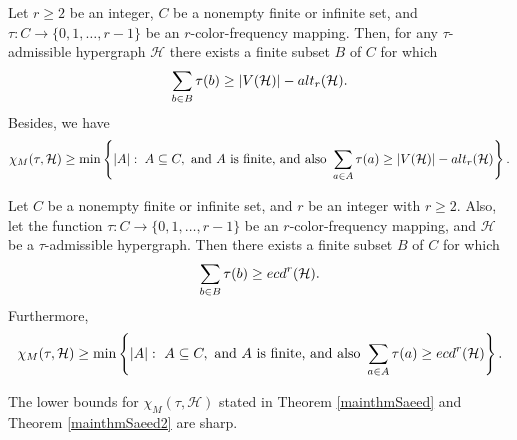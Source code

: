 \documentclass[10pt,a4paper]{amsart}
\begin{document}
\begin{theorem}\label{mainthmSaeed}
	Let $r\geq 2$ be an integer, $C$ be a nonempty finite or infinite set, and
	$\tau: C \longrightarrow \{0,1,\ldots,r-1\}$ be an $r$-color-frequency  mapping.
	Then, for any $\tau$-admissible hypergraph ${\mathcal H}$ there exists a finite subset
	$B$ of $C$ for which
	$$\sum_{b\in B}\tau(b) \geq  |V({\mathcal H})|-{\rm alt}_r({\mathcal H}) .$$
	Besides, we have
	$$\chi_M(\tau,{\mathcal H})\geq \min \left\{|A|:\;   A \subseteq C, \mbox{ and } A \mbox{ is finite,}  \mbox{ and also } \sum_{a\in A}\tau(a) \geq  |V({\mathcal H})|-{\rm alt}_r({\mathcal H})\right\}.$$
\end{theorem}

\begin{theorem} \label{mainthmSaeed2}
	Let $C$ be a nonempty finite or infinite set, and $r$ be an integer with $r\geq 2$.
	Also, let the function $\tau: C \longrightarrow \{0,1,\ldots,r-1\}$ be an $r$-color-frequency mapping, and ${\mathcal H}$ be a $\tau$-admissible hypergraph. Then
	there exists a finite subset
	$B$ of $C$ for which
	$$\sum_{b\in B}\tau(b) \geq  {\rm ecd}^r({\mathcal H}) .$$
	Furthermore,
	$$\chi_M(\tau,{\mathcal H})\geq \min\left\{|A|:\   A \subseteq C, \mbox{ and } A \mbox{ is finite,}  \mbox{ and also } \sum_{a\in A}\tau(a) \geq  {\rm ecd}^r({\mathcal H})\right\}.$$
\end{theorem}

\begin{proposition}
	The lower bounds for $\chi_M(\tau,{\mathcal H})$ stated in Theorem \ref{mainthmSaeed} and Theorem \ref{mainthmSaeed2} are sharp.
\end{proposition}
\end{document}
